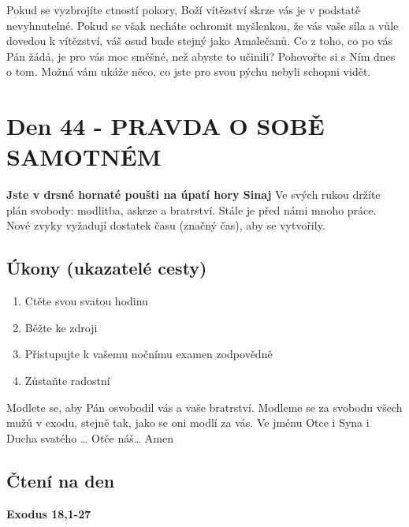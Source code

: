 \documentclass[11pt]{article}
\newcommand{\zacatekSedmyTyden}{
  \textbf{Jste v drsné hornaté poušti na úpatí hory Sinaj} \newline 
  Ve svých rukou držíte plán svobody: modlitba, askeze a bratrství. Stále je před námi mnoho práce. Nové zvyky vyžadují dostatek času (značný čas), aby se vytvořily.

  \subsection*{Úkony (ukazatelé cesty)}
\begin{enumerate}
  \item Ctěte svou svatou hodinu
  \item Běžte ke zdroji
  \item Přistupujte k vašemu nočnímu examen zodpovědně
  \item Zůstaňte radostní
\end{enumerate}
Modlete se, aby Pán osvobodil vás a vaše bratrství. \newline
Modleme se za svobodu všech mužů v exodu, stejně tak, jako se oni modlí za vás.\newline
Ve jménu Otce i Syna i Ducha svatého …  Otče náš… Amen
}
\begin{document}
Pokud se vyzbrojíte ctností pokory, Boží vítězství skrze vás je v podstatě nevyhnutelné. Pokud se však necháte
ochromit myšlenkou, že vás vaše síla a vůle dovedou k vítězství, váš osud bude stejný jako Amalečanů. Co
z toho, co po vás Pán žádá, je pro vás moc směšné, než abyste to učinili? Pohovořte si s Ním dnes o tom.
Možná vám ukáže něco, co jste pro svou pýchu nebyli schopni vidět.


\newpage
\section{Den 44 - PRAVDA O SOBĚ SAMOTNÉM }
\zacatekSedmyTyden
\subsection*{Čtení na den}
\textbf{Exodus 18,1-27}
\newline
\end{document}
